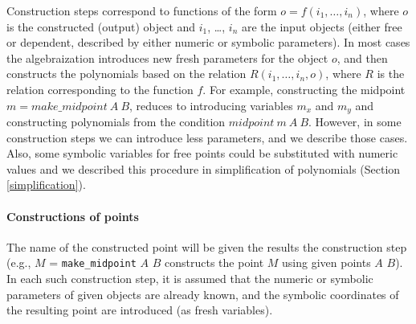 \documentclass[final,1p,times,authoryear]{elsarticle}
\begin{document}
Construction steps correspond to functions of the form $o = f(i_1,
\ldots, i_n)$, where $o$ is the constructed (output) object and $i_1$,
\ldots, $i_n$ are the input objects (either free or dependent,
described by either numeric or symbolic parameters). In most cases the
algebraization introduces new fresh parameters for the object $o$, and
then constructs the polynomials based on the relation $R(i_1, \ldots,
i_n, o)$, where $R$ is the relation corresponding to the function $f$.
For example, constructing the midpoint $m = make\_midpoint\ A\ B$, reduces
to introducing variables $m_x$ and $m_y$ and constructing polynomials
from the condition $midpoint\ m\ A\ B$. However, in some
construction steps we can introduce less parameters, and we describe
those cases. Also, some symbolic variables for free points could be
substituted with numeric values and we described this procedure in
simplification of polynomials (Section \ref{simplification}).

\paragraph{Constructions of points}

The name of the constructed point will be given the results the
construction step (e.g., $M$ = {\tt make\_midpoint} $A$ $B$ constructs
the point $M$ using given points $A$ $B$). In each such construction
step, it is assumed that the numeric or symbolic parameters of given
objects are already known, and the symbolic coordinates of the
resulting point are introduced (as fresh variables).
\end{document}
